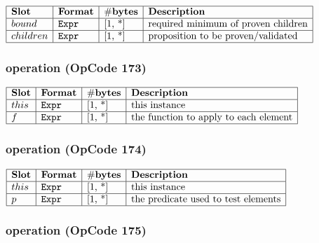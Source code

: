 \noindent
\(\begin{array}{| l | l | l | l |}
    \hline
    \bf{Slot} & \bf{Format} & \bf{\#bytes} & \bf{Description} \\
    \hline
         bound & \lst{Expr} & \text{[1, *]} & \text{required minimum of proven children} \\
    \hline
           children & \lst{Expr} & \text{[1, *]} & \text{proposition to be proven/validated} \\
    \hline
      
\end{array}\)
       

\subsubsection{ operation (OpCode 173)}

\noindent
\(\begin{array}{| l | l | l | l |}
    \hline
    \bf{Slot} & \bf{Format} & \bf{\#bytes} & \bf{Description} \\
    \hline
         this & \lst{Expr} & \text{[1, *]} & \text{this instance} \\
    \hline
           f & \lst{Expr} & \text{[1, *]} & \text{the function to apply to each element} \\
    \hline
      
\end{array}\)
       

\subsubsection{ operation (OpCode 174)}

\noindent
\(\begin{array}{| l | l | l | l |}
    \hline
    \bf{Slot} & \bf{Format} & \bf{\#bytes} & \bf{Description} \\
    \hline
         this & \lst{Expr} & \text{[1, *]} & \text{this instance} \\
    \hline
           p & \lst{Expr} & \text{[1, *]} & \text{the predicate used to test elements} \\
    \hline
      
\end{array}\)
       

\subsubsection{ operation (OpCode 175)}

